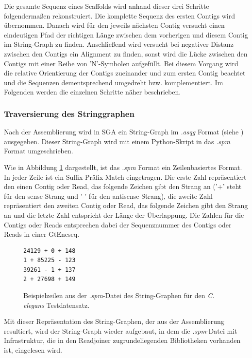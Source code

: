\documentclass[a4paper,10pt,parskip]{scrartcl}
\begin{document}
Die gesamte Sequenz eines Scaffolds wird anhand dieser drei Schritte
folgendermaßen rekonstruiert. Die komplette Sequenz des ersten Contigs
wird übernommen. Danach wird für den jeweils nächsten Contig versucht
einen eindeutigen Pfad der richtigen Länge zwischen dem vorherigen und
diesem Contig im String-Graph zu finden. Anschließend wird versucht
bei negativer Distanz zwischen den Contigs ein Alignment zu finden,
sonst wird die Lücke zwischen den Contigs mit einer Reihe von
'N'-Symbolen aufgefüllt. Bei diesem Vorgang wird die relative
Orientierung der Contigs zueinander und zum ersten Contig beachtet und
die Sequenzen dementsprechend umgedreht 
bzw. komplementiert. Im Folgenden werden die einzelnen
Schritte näher beschrieben.

\subsubsection{Traversierung des Stringgraphen}
Nach der Assemblierung wird in SGA ein String-Graph im \textit{.asqg}
Format (siehe \cite{asqg}) ausgegeben. Dieser String-Graph wird mit
einem Python-Skript in das \textit{.spm} Format umgeschrieben.

Wie in Abbildung \ref{abb: spm} dargestellt, ist das \textit{.spm}
Format ein Zeilenbasiertes Format. In jeder Zeile ist ein
Suffix-Präfix-Match eingetragen. Die erste Zahl repräsentiert den
einen Contig oder Read, das folgende Zeichen gibt den Strang an ('+'
steht für den sense-Strang und '-' für den antisense-Strang), die
zweite Zahl repräsentiert den zweiten Contig oder Read, das folgende
Zeichen gibt den Strang an und die letzte Zahl entspricht der Länge
der Überlappung. Die Zahlen für die Contigs oder Reads entsprechen
dabei der Sequenznummer des Contigs oder Reads in einer GtEncseq.

\begin{figure}
  \centering
\begin{verbatim}
24129 + 0 + 148
1 + 85225 - 123
39261 - 1 + 137
2 + 27698 + 149
\end{verbatim}
\caption{\label{abb: spm}Beispielzeilen aus der \textit{.spm}-Datei des
  String-Graphen für den \textit{C. elegans} Testdatensatz.}
\end{figure}

Mit dieser Repräsentation des String-Graphen, der aus der
Assemblierung resultiert, wird der String-Graph wieder aufgebaut, in
dem die \textit{.spm}-Datei mit Infrastruktur, die in den Readjoiner
zugrundeliegenden Bibliotheken vorhanden ist, eingelesen wird.
\end{document}
